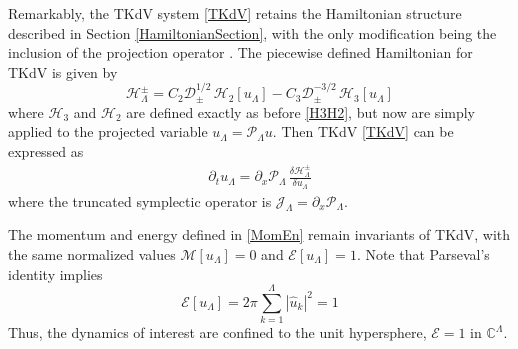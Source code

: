\documentclass[11pt]{article}
\newcommand{\abs}[1]{\left| #1 \right|}
\newcommand{\CC}{{\mathbb{C}}}
\newcommand{\drat}{\mathcal{D}}
\newcommand{\dratupdn}{\drat_{\pm}}
\newcommand{\En}{\mathcal{E}}
\newcommand{\Mo}{\mathcal{M}}
\newcommand{\uhat}{\hat{u}}
\newcommand{\sympJ}{\mathcal{J}}
\newcommand{\vard}[2]{\frac{\delta #1}{\delta #2}}
\newcommand{\Ham}{\mathcal{H}}
\newcommand{\Hthree}{\Ham_{3}}
\newcommand{\Htwo}{\Ham_{2}}
\newcommand{\Proj}{\mathcal{P}_{\Lambda}}
\newcommand{\uL}{u_{\Lambda}}
\newcommand{\HLupdn}{\Ham_{\Lambda}^{\pm}}
\newcommand{\SympL}{\sympJ_{\Lambda}}
\begin{document}
Remarkably, the TKdV system \eqref{TKdV} retains the Hamiltonian structure described in Section \ref{HamiltonianSection}, with the only modification being the inclusion of the projection operator \cite{bajars2013weakly, majda2019}. The piecewise defined Hamiltonian for TKdV is given by
\begin{equation}
\label{TruncHamiltonian}
\HLupdn = C_2 \dratupdn^{1/2} \, \Htwo[\uL] - C_3 \dratupdn^{-3/2} \, \Hthree[\uL]
\end{equation}
where $\Hthree$ and $\Htwo$ are defined exactly as before \eqref{H3H2}, but now are simply applied to the projected variable $\uL = \Proj u$.
Then TKdV \eqref{TKdV} can be expressed as
\begin{align}
\partial_t {\uL} = \partial_x \Proj \, \vard{\HLupdn}{\uL}
\end{align}
where the truncated symplectic operator is $\SympL = \partial_x \Proj$.

The momentum and energy defined in \eqref{MomEn} remain invariants of TKdV, with the same normalized values $\Mo[\uL] = 0$ and $\En[\uL] = 1$. Note that Parseval's identity implies
\begin{equation}
\En[\uL] = 2 \pi \sum_{k=1}^{\Lambda} \abs{\uhat_k}^2 = 1
\end{equation}
Thus, the dynamics of interest are confined to the unit hypersphere, $\En = 1$ in $\CC^{\Lambda}$.
\end{document}

